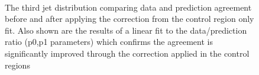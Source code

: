\begin{figure}[tbhp]
\begin{center}
        \\
        \caption{The third jet \pt distribution comparing data and prediction agreement before and after applying the correction from the control region only fit. Also shown are the results of a linear fit to the data/prediction ratio (p0,p1 parameters) which confirms the agreement is significantly improved through the correction applied in the control regions}
    \end{center}
\end{figure}
